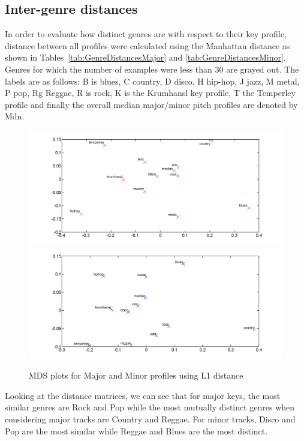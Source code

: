 \documentclass{article}
\begin{document}
\subsection{Inter-genre distances}
In order to evaluate how distinct genres are with respect to their key profile, distance between all profiles were calculated using the Manhattan distance as shown in Tables~\ref{tab:GenreDistancesMajor} and \ref{tab:GenreDistancesMinor}. Genres for which the number of examples were less than 30 are grayed out. The labels are as follows: B is blues, C country, D disco, H hip-hop, J jazz, M metal, P pop, Rg Reggae, R is rock, K is the Krumhansl key profile, T the Temperley profile \cite{temperley_tonal_2007} and finally the overall median major/minor pitch profiles are denoted by Mdn.

\begin{figure}
    \includegraphics[scale=.2]{graph/MDS_maj_colour}
    \includegraphics[scale=.2]{graph/MDS_min_colour}
	\caption{MDS plots for Major and Minor profiles using L1 distance}
	\label{fig:MDS}
\end{figure}

Looking at the distance matrices, we can see that for major keys, the most similar genres are Rock and Pop while the most mutually distinct genres when considering major tracks are Country and Reggae. For minor tracks, Disco and Pop are the most similar while Reggae and Blues are the most distinct.
\end{document}

